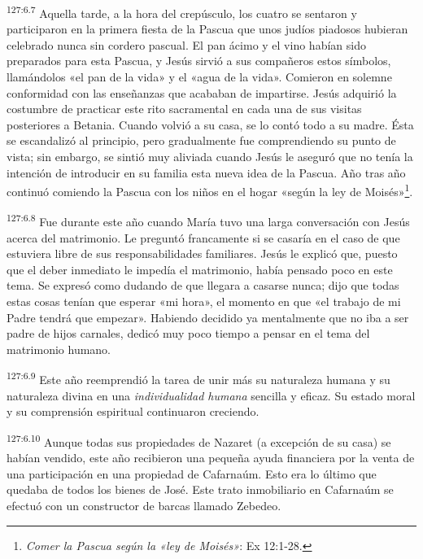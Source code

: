 \par 
\textsuperscript{127:6.7} Aquella tarde, a la hora del crepúsculo, los cuatro se sentaron y participaron en la primera fiesta de la Pascua que unos judíos piadosos hubieran celebrado nunca sin cordero pascual. El pan ácimo y el vino habían sido preparados para esta Pascua, y Jesús sirvió a sus compañeros estos símbolos, llamándolos «el pan de la vida» y el «agua de la vida». Comieron en solemne conformidad con las enseñanzas que acababan de impartirse. Jesús adquirió la costumbre de practicar este rito sacramental en cada una de sus visitas posteriores a Betania. Cuando volvió a su casa, se lo contó todo a su madre. Ésta se escandalizó al principio, pero gradualmente fue comprendiendo su punto de vista; sin embargo, se sintió muy aliviada cuando Jesús le aseguró que no tenía la intención de introducir en su familia esta nueva idea de la Pascua. Año tras año continuó comiendo la Pascua con los niños en el hogar «según la ley de Moisés»\footnote{\textit{Comer la Pascua según la «ley de Moisés»}: Ex 12:1-28.}.

\par 
\textsuperscript{127:6.8} Fue durante este año cuando María tuvo una larga conversación con Jesús acerca del matrimonio. Le preguntó francamente si se casaría en el caso de que estuviera libre de sus responsabilidades familiares. Jesús le explicó que, puesto que el deber inmediato le impedía el matrimonio, había pensado poco en este tema. Se expresó como dudando de que llegara a casarse nunca; dijo que todas estas cosas tenían que esperar «mi hora», el momento en que «el trabajo de mi Padre tendrá que empezar». Habiendo decidido ya mentalmente que no iba a ser padre de hijos carnales, dedicó muy poco tiempo a pensar en el tema del matrimonio humano.

\par 
\textsuperscript{127:6.9} Este año reemprendió la tarea de unir más su naturaleza humana y su naturaleza divina en una \textit{individualidad humana} sencilla y eficaz. Su estado moral y su comprensión espiritual continuaron creciendo.

\par 
\textsuperscript{127:6.10} Aunque todas sus propiedades de Nazaret (a excepción de su casa) se habían vendido, este año recibieron una pequeña ayuda financiera por la venta de una participación en una propiedad de Cafarnaúm. Esto era lo último que quedaba de todos los bienes de José. Este trato inmobiliario en Cafarnaúm se efectuó con un constructor de barcas llamado Zebedeo.

